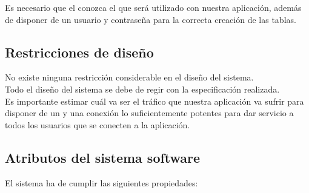 Es necesario que el  conozca el 
que será utilizado con nuestra aplicación, además de disponer de un
usuario y contraseña para la correcta creación de las tablas.

\subsection{Restricciones de diseño}

No existe ninguna restricción considerable en el diseño del sistema.\\

Todo el diseño del sistema se debe de regir con la especificación
realizada.\\

Es importante estimar cuál va ser el tráfico que nuestra aplicación va
sufrir para disponer de un  y una conexión lo
suficientemente potentes para dar servicio a todos los usuarios que se
conecten a la aplicación.

\subsection{Atributos del sistema software}
El sistema ha de cumplir las siguientes propiedades:

